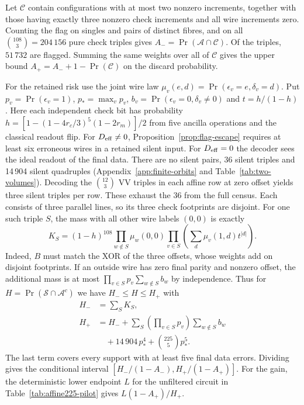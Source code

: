 \documentclass[10pt,twocolumn]{article}
\theoremstyle{definition}
\begin{document}
Let $\mathcal C$ contain configurations with at most two nonzero
increments, together with those having exactly three nonzero check
increments and all wire increments zero. Counting the flag on singles
and pairs of distinct fibres, and on all $\binom{108}{3}=204\,156$
pure check triples gives $A_-=\Pr(\mathcal A\cap\mathcal C)$.
Of the triples, $51\,732$ are flagged. Summing the same weights over
all of $\mathcal C$ gives the upper bound
$A_+=A_-+1-\Pr(\mathcal C)$ on the discard probability.

For the retained risk use the joint wire law
$\mu_v(e,d)=\Pr(\epsilon_v=e,\delta_v=d)$.
Put $p_v=\Pr(\epsilon_v=1)$, $p_*=\max_v p_v$,
$b_v=\Pr(\epsilon_v=0,\delta_v\ne0)$ and $t=h/(1-h)$.
Here each independent check bit has probability
$h=[1-(1-4r_c/3)^5(1-2r_m)]/2$ from five ancilla operations and the
classical readout flip.
For $D_{\rm eff}\ne0$, Proposition~\ref{prop:flag-escape} requires at
least six erroneous wires in a retained silent input. For $D_{\rm eff}=0$ the decoder sees
the ideal readout of the final data. There are no silent pairs, 36
silent triples and 14\,904 silent quadruples
(Appendix~\ref{app:finite-orbits} and Table~\ref{tab:two-volumes}).
Decoding the $\binom{12}{3}$ VV triples in each affine row at zero
offset yields three silent triples per row. These exhaust the 36 from
the full census. Each consists of three parallel lines, so its three
check footprints are disjoint. For one such triple $S$, the mass
with all other wire labels $(0,0)$ is exactly
\[
 K_S=(1-h)^{108}\prod_{w\notin S}\mu_w(0,0)
        \prod_{v\in S}\left(\sum_d\mu_v(1,d)t^{|d|}\right).
\]
Indeed, $B$ must match the XOR of the three offsets, whose weights
add on disjoint footprints. If an outside wire has zero final parity
and nonzero offset, the additional mass is at most
$\prod_{v\in S}p_v\sum_{w\notin S}b_w$ by independence.
Thus for $H=\Pr(\mathcal S\cap\mathcal A^c)$ we have $H_-\le H\le H_+$ with
\begin{align*}
 H_-&=\sum_S K_S,\\
 H_+&=H_-+\sum_S\left(\prod_{v\in S}p_v\right)\sum_{w\notin S}b_w\\
    &\quad+14\,904\,p_*^4+\binom{225}{5}p_*^5 .
\end{align*}
The last term covers every support with at least five final data
errors. Dividing gives the conditional interval
$[H_-/(1-A_-),H_+/(1-A_+)]$. For the gain, the deterministic lower
endpoint $L$ for the unfiltered circuit in Table~\ref{tab:affine225-pilot}
gives $L(1-A_+)/H_+$.
\end{document}
